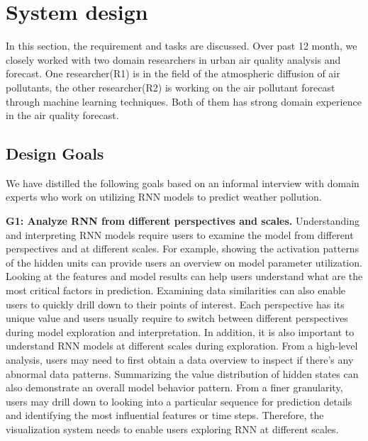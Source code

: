 \section{System design}
In this section, the requirement and tasks are discussed. Over past 12 month, we closely worked with two domain researchers in urban air quality analysis and forecast. One researcher(R1) is in the field of the atmospheric diffusion of air pollutants, the other researcher(R2) is working on the air pollutant forecast through machine learning techniques. Both of them has strong domain experience in the air quality forecast. 




\subsection{Design Goals}
We have distilled the following goals based on an informal interview with domain experts who work on utilizing RNN models to predict weather pollution.

\textbf{G1: Analyze RNN from different perspectives and scales.} 
Understanding and interpreting RNN models require users to examine the model from different perspectives and at different scales.
For example, showing the activation patterns of the hidden units can provide users an overview on model parameter utilization.
Looking at the features and model results can help users understand what are the most critical factors in prediction.
Examining data similarities can also enable users to quickly drill down to their points of interest.
Each perspective has its unique value and users usually require to switch between different perspectives during model exploration and interpretation.
In addition, it is also important to understand RNN models at different scales during exploration.
From a high-level analysis, users may need to first obtain a data overview to inspect if there's any abnormal data patterns.
Summarizing the value distribution of hidden states can also demonstrate an overall model behavior pattern.
From a finer granularity, users may drill down to looking into a particular sequence for prediction details and identifying the most influential features or time steps.
Therefore, the visualization system needs to enable users exploring RNN at different scales.


